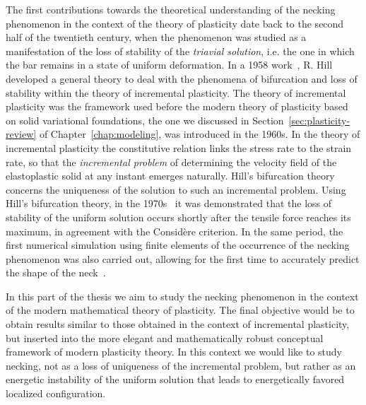 \documentclass[a4paper,10pt,oneside]{amsbook}
\numberwithin{section}{chapter}
\numberwithin{equation}{chapter}
\theoremstyle{definition}
\begin{document}
The first contributions towards the theoretical understanding of the necking phenomenon in the context of the theory of plasticity date back to the second half of the twentieth century, when the phenomenon was studied as a manifestation of the loss of stability of the \emph{triavial solution}, i.e. the one in which the bar remains in a state of uniform deformation. In a 1958 work~\cite{Hill1958}, R. Hill developed a general theory to deal with the phenomena of bifurcation and loss of stability within the theory of incremental plasticity. The theory of incremental plasticity was the framework used before the modern theory of plasticity based on solid variational foundations, the one we discussed in Section~\ref{sec:plasticity-review} of Chapter~\ref{chap:modeling}, was introduced in the 1960s. In the theory of incremental plasticity the constitutive relation links the stress rate to the strain rate, so that the \emph{incremental problem} of determining the velocity field of the elastoplastic solid at any instant emerges naturally. Hill's bifurcation theory concerns the uniqueness of the solution to such an incremental problem. Using Hill's bifurcation theory, in the 1970s~\cite{HillHutchinson1975,HutchinsonMiles1974} it was demonstrated that the loss of stability of the uniform solution occurs shortly after the tensile force reaches its maximum, in agreement with the Considère criterion. In the same period, the first numerical simulation using finite elements of the occurrence of the necking phenomenon was also carried out, allowing for the first time to accurately predict the shape of the neck~\cite{Needleman1972}.

In this part of the thesis we aim to study the necking phenomenon in the context of the modern mathematical theory of plasticity. The final objective would be to obtain results similar to those obtained in the context of incremental plasticity, but inserted into the more elegant and mathematically robust conceptual framework of modern plasticity theory. In this context we would like to study necking, not as a loss of uniqueness of the incremental problem, but rather as an energetic instability of the uniform solution that leads to energetically favored localized configuration.
\end{document}
